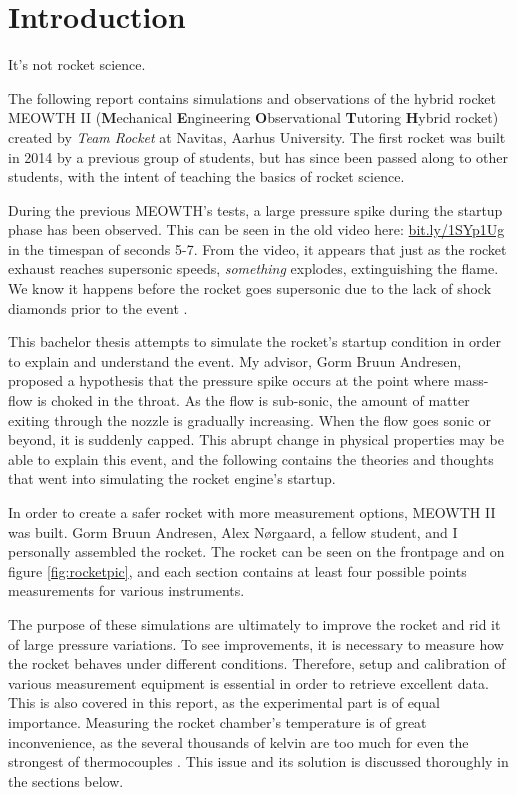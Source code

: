 \chapter{Introduction}

It's not rocket science.

The following report contains simulations and observations of the hybrid rocket MEOWTH II (\textbf{M}echanical \textbf{E}ngineering \textbf{O}bservational \textbf{T}utoring \textbf{H}ybrid rocket) created by \emph{Team Rocket} \cite{bulba} at Navitas, Aarhus University. The first rocket was built in 2014 by a previous group of students, but has since been passed along to other students, with the intent of teaching the basics of rocket science.


During the previous MEOWTH's tests, a large pressure spike during the startup phase has been observed. This can be seen in the old video here: \url{bit.ly/1SYp1Ug} in the timespan of seconds 5-7. From the video, it appears that just as the rocket exhaust reaches supersonic speeds, \emph{something} explodes, extinguishing the flame. We know it happens before the rocket goes supersonic due to the lack of shock diamonds prior to the event \cite{rockProp}.


This bachelor thesis attempts to simulate the rocket's startup condition in order to explain and understand the event. My advisor, Gorm Bruun Andresen, proposed a hypothesis that the pressure spike occurs at the point where mass-flow is choked in the throat. As the flow is sub-sonic, the amount of matter exiting through the nozzle is gradually increasing. When the flow goes sonic or beyond, it is suddenly capped. This abrupt change in physical properties may be able to explain this event, and the following contains the theories and thoughts that went into simulating the rocket engine's startup.


In order to create a safer rocket with more measurement options, MEOWTH II was built. Gorm Bruun Andresen, Alex Nørgaard, a fellow student, and I personally assembled the rocket. The rocket can be seen on the frontpage and on figure \ref{fig:rocketpic}, and each section contains at least four possible points measurements for various instruments.


The purpose of these simulations are ultimately to improve the rocket and rid it of large pressure variations. To see improvements, it is necessary to measure how the rocket behaves under different conditions. Therefore, setup and calibration of various measurement equipment is essential in order to retrieve excellent data. This is also covered in this report, as the experimental part is of equal importance. Measuring the rocket chamber's temperature is of great inconvenience, as the several thousands of kelvin are too much for even the strongest of thermocouples \cite{thermocoup}. This issue and its solution is discussed thoroughly in the sections below.

